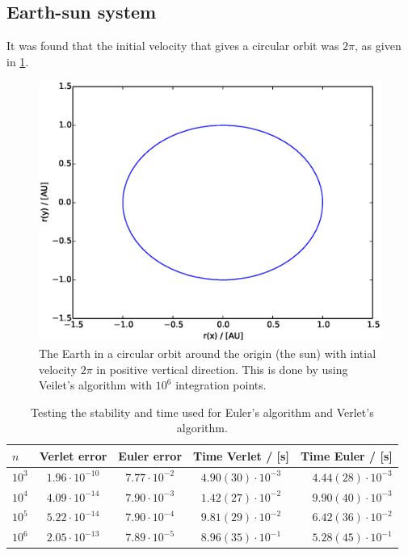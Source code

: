 \documentclass{article}
\begin{document}
\subsection{Earth-sun system}
It was found that the initial velocity that gives a circular orbit was $2\pi$, as given in \ref{jordensbane}.
\begin{figure}[H]
  \includegraphics[scale=0.6]{plots/3c_jordensbane_verlet_n10e6.eps}
  \caption{The Earth in a circular orbit around the origin (the sun) with intial velocity $2\pi$ in positive vertical direction. This is done by using Veilet's algorithm with $10^6$ integration points.}
  \label{jordensbane}
\end{figure}

\begin{table}[H]
    \centering
    \begin{tabular}{|l|c|c|c|r|}
    \hline
     $n$ & Verlet error  & Euler error & Time Verlet / [s] & Time Euler / [s]\\
     \hline
      $10^3$  & $1.96\cdot10^{-10}$  & $7.77\cdot10^{-2}$ & $ 4.90 (30) \cdot 10^{-3}$ & $ 4.44 (28) \cdot 10^{-3}$\\
      $10^4$  & $4.09\cdot10^{-14}$  & $7.90\cdot10^{-3}$ & $ 1.42 (27) \cdot 10^{-2}$ & $ 9.90 (40) \cdot 10^{-3}$\\
      $10^5$  & $5.22\cdot10^{-14}$  & $7.90\cdot10^{-4}$ & $ 9.81 (29) \cdot 10^{-2}$ & $ 6.42 (36) \cdot 10^{-2}$\\
      $10^6$  & $2.05\cdot10^{-13}$  & $7.89\cdot10^{-5}$ & $ 8.96 (35) \cdot 10^{-1}$ & $ 5.28 (45) \cdot 10^{-1}$\\
      \hline
    \end{tabular}
    \caption{Testing the stability and time used for Euler's algorithm and Verlet's algorithm.}
    \label{stability}
\end{table}
\end{document}
